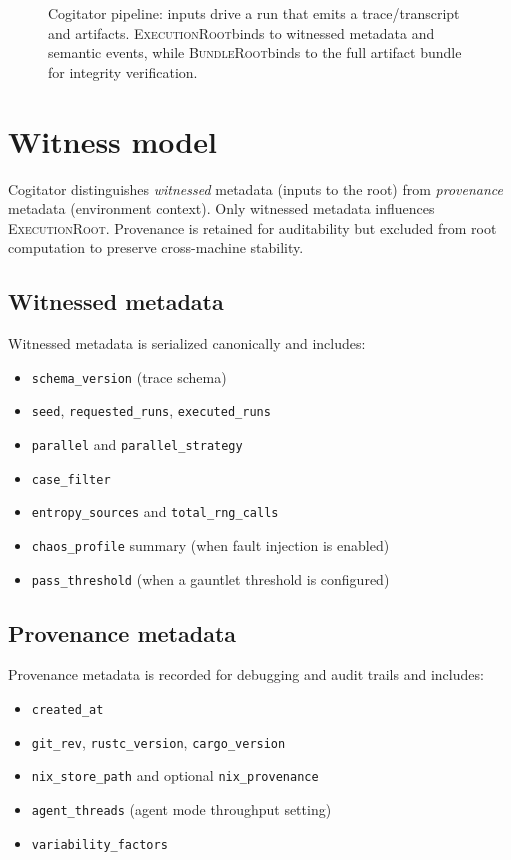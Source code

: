 \documentclass[11pt]{article}
\newcommand{\ExecutionRoot}{\textsc{ExecutionRoot}}
\newcommand{\BundleRoot}{\textsc{BundleRoot}}
\begin{document}
\begin{figure}[t]
  \centering
  
  \caption{Cogitator pipeline: inputs drive a run that emits a trace/transcript and artifacts.
  \ExecutionRoot binds to witnessed metadata and semantic events, while \BundleRoot binds to the
  full artifact bundle for integrity verification.}
  \label{fig:pipeline}
\end{figure}

\section{Witness model}
Cogitator distinguishes \emph{witnessed} metadata (inputs to the root) from
\emph{provenance} metadata (environment context). Only witnessed metadata influences
\ExecutionRoot. Provenance is retained for auditability but excluded from root
computation to preserve cross-machine stability.

\subsection{Witnessed metadata}
Witnessed metadata is serialized canonically and includes:
\begin{itemize}[leftmargin=1.4em]
  \item \texttt{schema\_version} (trace schema)
  \item \texttt{seed}, \texttt{requested\_runs}, \texttt{executed\_runs}
  \item \texttt{parallel} and \texttt{parallel\_strategy}
  \item \texttt{case\_filter}
  \item \texttt{entropy\_sources} and \texttt{total\_rng\_calls}
  \item \texttt{chaos\_profile} summary (when fault injection is enabled)
  \item \texttt{pass\_threshold} (when a gauntlet threshold is configured)
\end{itemize}

\subsection{Provenance metadata}
Provenance metadata is recorded for debugging and audit trails and includes:
\begin{itemize}[leftmargin=1.4em]
  \item \texttt{created\_at}
  \item \texttt{git\_rev}, \texttt{rustc\_version}, \texttt{cargo\_version}
  \item \texttt{nix\_store\_path} and optional \texttt{nix\_provenance}
  \item \texttt{agent\_threads} (agent mode throughput setting)
  \item \texttt{variability\_factors}
\end{itemize}
\end{document}
